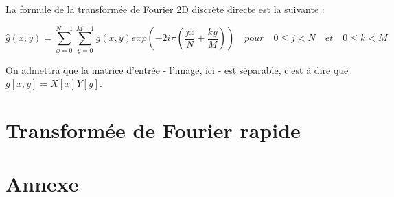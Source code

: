 \documentclass{article}
\begin{document}
La formule de la transformée de Fourier 2D discrète directe est la suivante :

\begin{equation}
	\widehat{g}(x,y) = \sum_{x = 0}^{N-1}\sum_{y = 0}^{M-1}g(x,y) exp(-2i\pi(\frac{jx}{N}+\frac{ky}{M})) \quad pour \quad 0 \leq j < N\quad et \quad 0 \leq k < M
\end{equation}

\noindent On admettra que la matrice d'entrée - l'image, ici - est séparable, c'est à dire que $g[x,y] = X[x]Y[y]$. 


\section{Transformée de Fourier rapide}

\section{Annexe}
\end{document}
